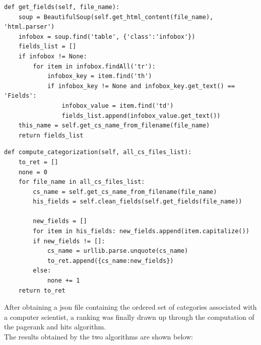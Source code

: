 \documentclass[12pt, twoside]{article}
\begin{document}
\noindent\begin{minipage}[t]{.52\linewidth}
\centering
\begin{lstlisting}[language = iPython, caption={Get Fields},captionpos=b]
def get_fields(self, file_name):
	soup = BeautifulSoup(self.get_html_content(file_name), 'html.parser')
	infobox = soup.find('table', {'class':'infobox'})
	fields_list = []
	if infobox != None:
		for item in infobox.findAll('tr'):
			infobox_key = item.find('th')
			if infobox_key != None and infobox_key.get_text() == 'Fields':
				infobox_value = item.find('td')
				fields_list.append(infobox_value.get_text())
	this_name = self.get_cs_name_from_filename(file_name)
	return fields_list
\end{lstlisting}

\end{minipage}\hfill
\noindent\begin{minipage}[t]{.46\textwidth}
\centering
\begin{lstlisting}[language = iPython, caption={Categorization },captionpos=b]
def compute_categorization(self, all_cs_files_list):
	to_ret = []
	none = 0
	for file_name in all_cs_files_list:
		cs_name = self.get_cs_name_from_filename(file_name)
		his_fields = self.clean_fields(self.get_fields(file_name))

		new_fields = []
		for item in his_fields:	new_fields.append(item.capitalize())
		if new_fields != []:
			cs_name = urllib.parse.unquote(cs_name)
			to_ret.append({cs_name:new_fields})
		else:
			none += 1
	return to_ret
\end{lstlisting}

\end{minipage}	
\noindent After obtaining a json file containing the ordered set of categories associated with a computer scientist, a ranking was finally drawn up through the computation of the pagerank and hits algorithm. \\
The results obtained by the two algorithms are shown below:

\begin{paracol}{2}
\switchcolumn
{}
\end{paracol}
\end{document}
